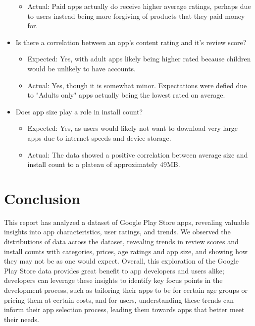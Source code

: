 \documentclass[12pt]{report}\usepackage[]{graphicx}\usepackage[]{xcolor}
\begin{document}
\begin{itemize}
\begin{itemize}
        \item Actual: Paid apps actually do receive higher average ratings, perhaps due to users instead being more
                      forgiving of products that they paid money for.
    \end{itemize}
    \item Is there a correlation between an app's content rating and it's review score?
    \begin{itemize}
        \item Expected: Yes, with adult apps likely being higher rated because children
        would be unlikely to have accounts.
        \item Actual: Yes, though it is somewhat minor. Expectations were defied due to "Adults only" apps
                      actually being the lowest rated on average.
    \end{itemize}
    \item Does app size play a role in install count?
    \begin{itemize}
        \item Expected: Yes, as users would likely not want to download very large
        apps due to internet speeds and device storage.
        \item Actual: The data showed a positive correlation between average size and install count to a plateau of approximately 49MB.
    \end{itemize}
\end{itemize}

\section{Conclusion}

This report has analyzed a dataset of Google Play Store apps,
revealing valuable insights into app characteristics, user ratings, and trends. 
We observed the distributions of data across the dataset, revealing trends in 
review scores and install counts with categories, prices, age ratings and app size, and showing 
how they may not be as one would expect.
Overall, this exploration of the Google Play Store data provides great benefit to
app developers and users alike; developers can leverage these insights to 
identify key focus points in the development process, such as tailoring their apps to be for certain age 
groups or pricing them at certain costs, and for users, understanding these
trends can inform their app selection process, leading them towards apps that better meet their needs.

\printbibliography{}
\end{document}
